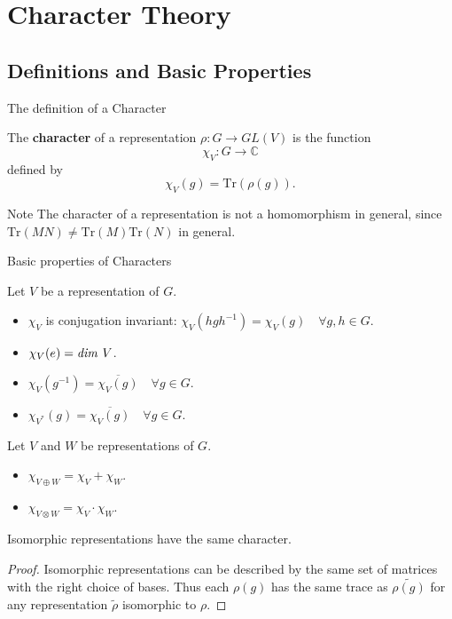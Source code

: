 \section{Character Theory}
\subsection{Definitions and Basic Properties}
\begin{frame}{The definition of a Character}
\begin{definition}
The \textbf{character} of a representation $\rho \colon G \to GL(V)$ is the function \[ \chi_V \colon G \to \mathbb{C}\] defined by \[\chi_V(g) = \text{Tr}(\rho(g)).\]
\end{definition}
\begin{block}{Note}
The character of a representation is not a homomorphism in general, since $\text{Tr}(MN) \neq \text{Tr}(M) \text{Tr}(N)$ in general.
\end{block}
\end{frame}

\begin{frame}{Basic properties of Characters}
\begin{proposition}
Let $V$ be a representation of $G$.
\begin{itemize}
\item $\chi_V$ is conjugation invariant: $\chi_V (h g h^{-1}) = \chi_V (g) \quad \forall g , h \in G$.
\item $\chi_V (e) = \text{\emph{dim }} V$.
\item \label{char-of-inverse} $\chi_V (g^{-1}) = \overline{\chi_V (g)} \quad \forall g \in G$.
\item $\chi_{V^*} (g) =  \overline{\chi_V (g)}\quad \forall g \in G$.
\end{itemize}
\end{proposition}
\begin{proposition}
Let $V$ and $W$ be representations of $G$.
\begin{itemize}
\item $\chi _{V \oplus W} = \chi_V + \chi_W$.
\item $\chi_{V \otimes W} = \chi_V \cdot \chi_W$.
\end{itemize}
\end{proposition}
\end{frame}

\begin{frame}
\begin{proposition}
Isomorphic representations have the same character.
\end{proposition}
\begin{proof}
Isomorphic representations can be described by the same set of matrices with the right choice of bases.  Thus each $\rho(g)$ has the same trace as $\widetilde{\rho(g)}$ for any representation $\widetilde{\rho}$ isomorphic to $\rho$.
\end{proof}
\end{frame}

